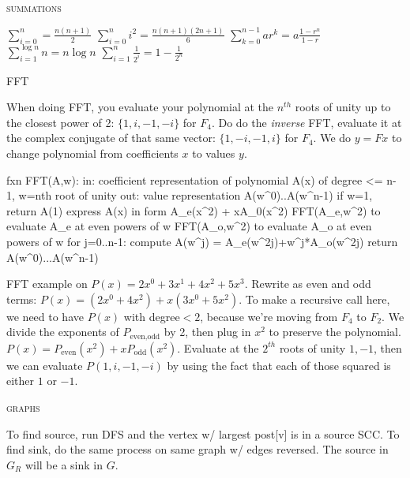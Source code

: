 \documentclass[10pt,twocolumn]{article}
\begin{document}
\begin{center}\textsc{summations}\end{center} 
$\displaystyle\sum_{i=0}^n = \frac{n(n+1)}{2} $ $\displaystyle\sum_{i=0}^n i^2 = \frac{n(n+1)(2n+1)}{6} $ $ \displaystyle\sum_{k=0}^{n-1}ar^k=a \frac{1-r^n}{1-r}$	$\displaystyle\sum_{i=1}^{\log n}n = n\log n$ $\displaystyle\sum_{i=1}^n \frac{1}{2^i} =1-\frac{1}{2^n} $
\begin{center}\textsc{FFT}\end{center} 
When doing FFT, you evaluate your polynomial at the $n^{th}$ roots of unity up to the closest power of 2: $\{1,i,-1,-i\}$ for $F_4$. Do do the \emph{inverse} FFT, evaluate it at the complex conjugate of that same vector: $\{1,-i,-1,i\}$ for $F_4$. We do $y=Fx$ to change polynomial from coefficients $x$ to values $y$.
\begin{verbatimtab}[1]
fxn FFT(A,w):
in: coefficient representation of polynomial
		A(x) of degree <= n-1, w=nth root of unity
out: value representation A(w^0)..A(w^n-1)
if w=1, return A(1)
express A(x) in form A_e(x^2) + xA_0(x^2)
FFT(A_e,w^2) to evaluate A_e at even powers of w
FFT(A_o,w^2) to evaluate A_o at even powers of w
for j=0..n-1:
	compute A(w^j) = A_e(w^2j)+w^j*A_o(w^2j)
return A(w^0)...A(w^n-1)
\end{verbatimtab}
FFT example on $P(x)=2x^0+3x^1+4x^2+5x^3$. Rewrite as even and odd terms: $P(x)=(2x^0+4x^2)+x(3x^0+5x^2)$. To make a recursive call here, we need to have $P(x)$ with degree$<2$, because we're moving from $F_4$ to $F_2$. We divide the exponents of $P_{\mbox{even,odd}}$ by 2, then plug in $x^2$ to preserve the polynomial. $P(x)=P_{\mbox{even}}(x^2)+xP_{\mbox{odd}}(x^2)$. Evaluate at the $2^{th}$ roots of unity $1,-1$, then we can evaluate $P(1,i,-1,-i)$ by using the fact that each of those squared is either $1$ or $-1$.
\begin{center}\textsc{graphs}\end{center} 
To find source, run DFS and the vertex w/ largest post[v] is in a source SCC. To find sink, do the same process on same graph w/ edges reversed. The source in $G_R$ will be a sink in $G$.
\end{document}
